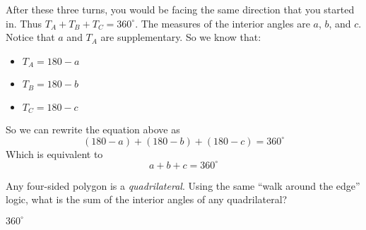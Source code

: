 After these three turns, you would be facing the same direction that
you started in. Thus $T_A + T_B + T_C = 360^\circ$. The
measures of the interior angles are $a$, $b$, and $c$. Notice that $a$ and
$T_A$ are supplementary. So we know that:
\begin{itemize}
\item $T_A = 180 - a$
\item $T_B = 180 - b$
\item $T_C = 180 - c$
\end{itemize}
So we can rewrite the equation above as
\begin{equation*}
  (180 - a) + (180 - b) + (180 - c) = 360^\circ
\end{equation*}
Which is equivalent to
\begin{equation*}
  a + b + c = 360^\circ
\end{equation*}

\begin{Exercise}[title={Interior Angles of a Quadrilateral}, label=interior_of_quad]
  Any four-sided polygon is a \emph{quadrilateral}. Using the same
  ``walk around the edge'' logic, what is the sum of the interior
  angles of any quadrilateral?
\end{Exercise}
\begin{Answer}[ref=interior_of_quad]
$360^\circ$
\end{Answer}

